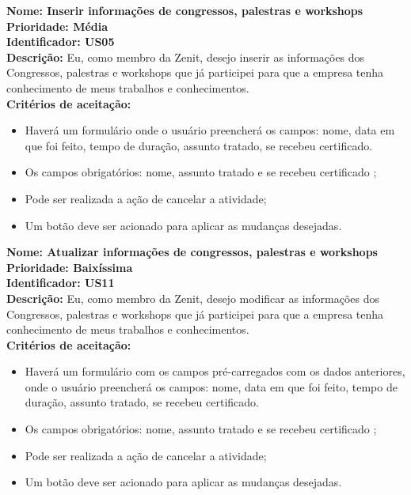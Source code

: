 \begin{anexosenv}
\textbf{Nome: Inserir informações de congressos, palestras e workshops\\
    Prioridade: Média\\
    Identificador: US05\\
    Descrição:} Eu, como membro da Zenit, desejo inserir as informações dos Congressos, palestras e workshops que já participei para que a empresa tenha conhecimento de meus trabalhos e conhecimentos.\\
\textbf{Critérios de aceitação:}
\begin{itemize}
    \item Haverá um formulário onde o usuário preencherá os campos: nome, data em que foi feito, tempo de duração, assunto tratado, se recebeu certificado.
    \item Os campos obrigatórios: nome, assunto tratado e se recebeu certificado ;
    \item Pode ser realizada a ação de cancelar a atividade;
    \item Um botão deve ser acionado para aplicar as mudanças desejadas.
\end{itemize}

\textbf{Nome: Atualizar informações de congressos, palestras e workshops\\
    Prioridade: Baixíssima\\
    Identificador: US11\\
    Descrição:} Eu, como membro da Zenit, desejo modificar as informações dos Congressos, palestras e workshops que já participei para que a empresa tenha conhecimento de meus trabalhos e conhecimentos.\\
\textbf{Critérios de aceitação:}
\begin{itemize}
    \item Haverá um formulário com os campos pré-carregados com os dados anteriores, onde o usuário preencherá os campos: nome, data em que foi feito, tempo de duração, assunto tratado, se recebeu certificado.
    \item Os campos obrigatórios: nome, assunto tratado e se recebeu certificado ;
    \item Pode ser realizada a ação de cancelar a atividade;
    \item Um botão deve ser acionado para aplicar as mudanças desejadas.
    
\end{itemize}


\end{anexosenv}
